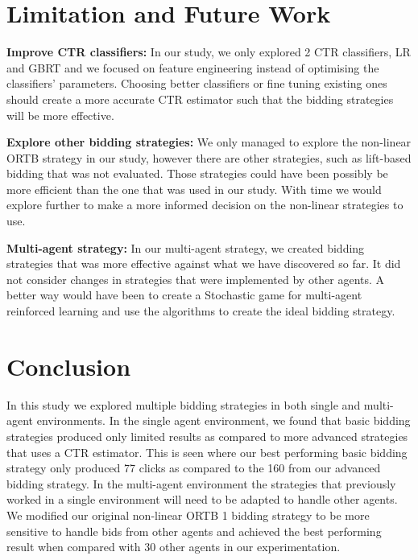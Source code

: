 \documentclass{sig-alternate-05-2015}
\begin{document}
\section{Limitation and Future Work}
\textbf{Improve CTR classifiers:}
In our study, we only explored 2 CTR classifiers, LR and GBRT and we focused on feature engineering instead of optimising the classifiers' parameters. Choosing better classifiers or fine tuning existing ones should create a more accurate CTR estimator such that the bidding strategies will be more effective. 

\textbf{Explore other bidding strategies:}
We only managed to explore the non-linear ORTB strategy in our study, however there are other strategies, such as lift-based bidding\cite{xu_lift-based_2015} that was not evaluated. Those strategies could have been possibly be more efficient than the one that was used in our study. With time we would explore further to make a more informed decision on the non-linear strategies to use.

\textbf{Multi-agent strategy:}
In our multi-agent strategy, we created bidding strategies that was more effective against what we have discovered so far. It did not consider changes in strategies that were implemented by other agents. A better way would have been to create a Stochastic game for multi-agent reinforced learning \cite{jin_multiagent_2018} and use the algorithms to create the ideal bidding strategy. 

\section{Conclusion}
In this study we explored multiple bidding strategies in both single and multi-agent environments. In the single agent environment, we found that basic bidding strategies produced only limited results as compared to more advanced strategies that uses a CTR estimator. This is seen where our best performing basic bidding strategy only produced 77 clicks as compared to the 160 from our advanced bidding strategy. In the multi-agent environment the strategies that previously worked in a single environment will need to be adapted to handle other agents. We modified our original non-linear ORTB 1 bidding strategy to be more sensitive to handle bids from other agents and achieved the best performing result when compared with 30 other agents in our experimentation. 

\clearpage
\newpage

  
\end{document}
